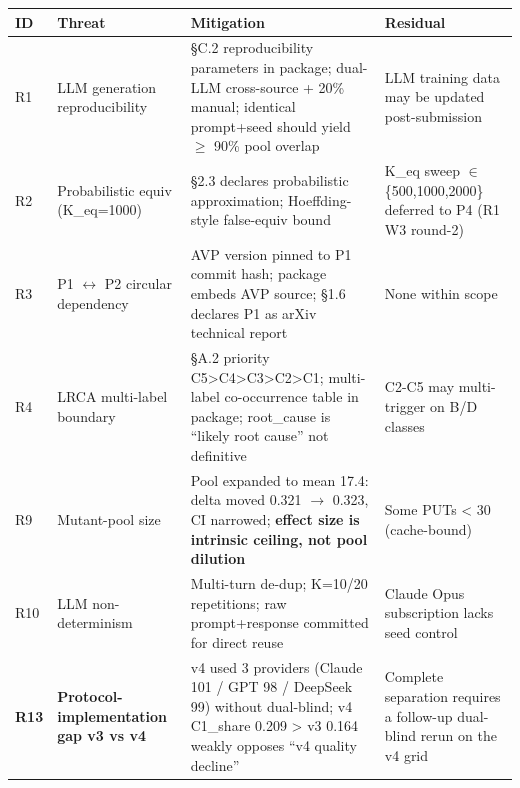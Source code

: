 \documentclass[review,12pt,authoryear]{elsarticle}
\newcounter{none}                   %
\begin{document}
{\def\LTcaptype{none} %
\begin{longtable}[]{@{}
  >{\raggedright\arraybackslash}p{}
  >{\raggedright\arraybackslash}p{}
  >{\raggedright\arraybackslash}p{}
  >{\raggedright\arraybackslash}p{}@{}}
\toprule\noalign{}
\begin{minipage}[b]{\linewidth}\raggedright
ID
\end{minipage} & \begin{minipage}[b]{\linewidth}\raggedright
Threat
\end{minipage} & \begin{minipage}[b]{\linewidth}\raggedright
Mitigation
\end{minipage} & \begin{minipage}[b]{\linewidth}\raggedright
Residual
\end{minipage} \\
\midrule\noalign{}
\endhead
\bottomrule\noalign{}
\endlastfoot
R1 & LLM generation reproducibility & §C.2 reproducibility parameters in
package; dual-LLM cross-source + 20\% manual; identical prompt+seed
should yield $\geq$ 90\% pool overlap & LLM training data may be updated
post-submission \\
R2 & Probabilistic equiv (K\_eq=1000) & §2.3 declares probabilistic
approximation; Hoeffding-style false-equiv bound & K\_eq sweep $\in$
\{500,1000,2000\} deferred to P4 (R1 W3 round-2) \\
R3 & P1 $\leftrightarrow$ P2 circular dependency & AVP version pinned to P1 commit hash;
package embeds AVP source; §1.6 declares P1 as arXiv technical report &
None within scope \\
R4 & LRCA multi-label boundary & §A.2 priority
C5\textgreater C4\textgreater C3\textgreater C2\textgreater C1;
multi-label co-occurrence table in package; root\_cause is ``likely root
cause'' not definitive & C2-C5 may multi-trigger on B/D classes \\
R9 & Mutant-pool size & Pool expanded to mean 17.4: delta moved 0.321 $\to$
0.323, CI narrowed; \textbf{effect size is intrinsic ceiling, not pool
dilution} & Some PUTs \textless{} 30 (cache-bound) \\
R10 & LLM non-determinism & Multi-turn de-dup; K=10/20 repetitions; raw
prompt+response committed for direct reuse & Claude Opus subscription
lacks seed control \\
\textbf{R13} & \textbf{Protocol-implementation gap v3 vs v4} & v4 used 3
providers (Claude 101 / GPT 98 / DeepSeek 99) without dual-blind; v4
C1\_share 0.209 \textgreater{} v3 0.164 weakly opposes ``v4 quality
decline'' & Complete separation requires a follow-up dual-blind rerun on
the v4 grid \\
\end{longtable}
}
\end{document}
